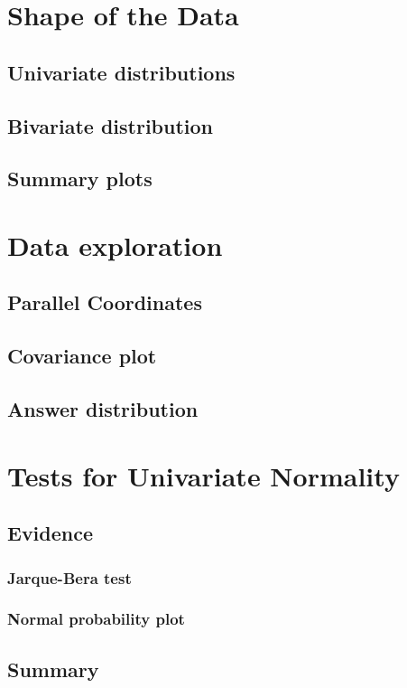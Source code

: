 \documentclass[12pt]{article}
\begin{document}
\newpage
\section{Shape of the Data}
\subsection{Univariate distributions}
\subsection{Bivariate distribution}
\subsection{Summary plots}

\newpage
\section{Data exploration}
\subsection{Parallel Coordinates}
\subsection{Covariance plot}
\subsection{Answer distribution}

\newpage
\section{Tests for Univariate Normality}
\subsection{Evidence}
\subsubsection{Jarque-Bera test}
\subsubsection{Normal probability plot}
\subsection{Summary}
\end{document}
